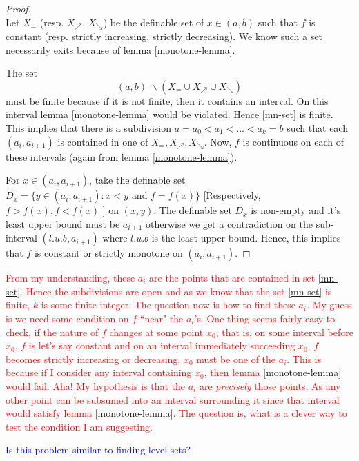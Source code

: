\begin{proof}
    \\ Let $X_{=}$ (resp. $X_\nearrow$, $X_\searrow$) be the definable set of $x\in (a, b)$ such that $f$ is constant (resp. strictly increasing, strictly decreasing). We know such a set necessarily exits because of lemma \ref{monotone-lemma}. \par The set 
    \begin{equation}
    \label{mn-set}
        (a, b) \;\backslash (X_=\cup X_\nearrow \cup X_\searrow)
    \end{equation}
    must be finite because if it is not finite, then it contains an interval. On this interval lemma \ref{monotone-lemma} would be violated. Hence \ref{mn-set} is finite. This implies that there is a subdivision $a = a_0 < a_1 < ... < a_k = b$ such that each $(a_i, a_{i+1})$ is contained in one of $X_=, X_\nearrow, X_\searrow$. Now, $f$ is continuous on each of these intervals (again from lemma \ref{monotone-lemma}). \par For $x\in (a_i, a_{i+1})$, take the definable set $D_x = \{y\in(a_i, a_{i+1}): x < y \text{ and } f = f(x)\}$ [Respectively, $f > f(x), f < f(x)$ ] on $(x,y)$. The definable set $D_x$ is non-empty and it's least upper bound must be $a_{i+1}$ otherwise we get a contradiction on the sub-interval $(l.u.b, a_{i+1})$ where $l.u.b$ is the least upper bound. Hence, this implies that $f$ is constant or strictly monotone on $(a_i, a_{i+1})$.
\end{proof}

\textcolor{red}{From my understanding, these $a_i$ are the points that are contained in set \ref{mn-set}. Hence the subdivisions are open and as we know that the set \ref{mn-set} is finite, $k$ is some finite integer. The question now is how to find these $a_i$. My guess is we need some condition on $f$ ``near" the $a_i$'s. One thing seems fairly easy to check, if the nature of $f$ changes at some point $x_0$, that is, on some interval before $x_0$, $f$ is let's say constant and on an interval immediately succeeding $x_0$, $f$ becomes strictly increasing or decreasing, $x_0$ must be one of the $a_i$. This is because if I consider any interval containing $x_0$, then lemma \ref{monotone-lemma} would fail. Aha! My hypothesis is that the $a_i$ are \textit{precisely} those points. As any other point can be subsumed into an interval surrounding it since that interval would satisfy lemma \ref{monotone-lemma}. The question is, what is a clever way to test the condition I am suggesting.}
\par
\textcolor{blue}{Is this problem similar to finding level sets?}


